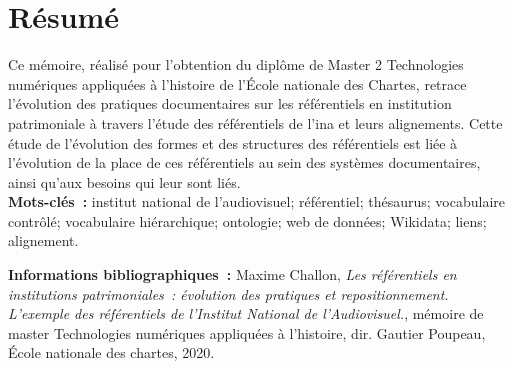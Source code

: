 	\chapter*{Résumé}
	\medskip
	Ce mémoire, réalisé pour l'obtention du diplôme de Master 2 \og Technologies numériques appliquées à l'histoire\fg{} de l'École nationale des Chartes, retrace l'évolution des pratiques documentaires sur les référentiels en institution patrimoniale à travers l'étude des référentiels de l'\ac{ina} et leurs alignements. Cette étude de l'évolution des formes et des structures des référentiels est liée à l'évolution de la place de ces référentiels au sein des systèmes documentaires, ainsi qu'aux besoins qui leur sont liés.\\
	
	\textbf{Mots-clés~:} institut national de l'audiovisuel; référentiel; thésaurus; vocabulaire contrôlé; vocabulaire hiérarchique; ontologie; web de données; Wikidata; liens; alignement.
	
	\textbf{Informations bibliographiques~:} Maxime Challon, \textit{Les référentiels en institutions patrimoniales : évolution des pratiques et repositionnement. L’exemple des référentiels de l’Institut National de l’Audiovisuel.}, mémoire de master \og{}Technologies numériques appliquées à l'histoire\fg{}, dir. Gautier Poupeau, École nationale des chartes, 2020.
